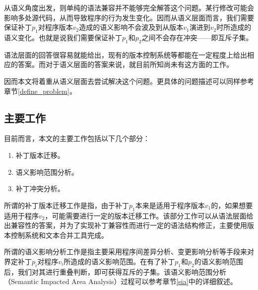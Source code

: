 从语义角度出发，则单纯的语法兼容并不能够完全解答这个问题。某行修改可能会影响多处源代码，从而导致程序的行为发生变化。因而从语义层面而言，我们需要保证补丁$p_1$对程序版本$v_2$造成的语义影响不会波及到从版本$v_1$演进到$v_2$时所造成的语义变化。也就是说我们需要保证补丁$p_1$和$p_2$之间不会存在冲突——即互斥子集。

语法层面的回答很容易就能给出，现有的版本控制系统等都能在一定程度上给出相应的答案。而对于语义层面的答案来说，就目前所知尚未有这方面的工作。

因而本文将着重从语义层面去尝试解决这个问题。更具体的问题描述可以同样参考章节\ref {define_problem}。


\subsection{主要工作}

目前而言，本文的主要工作包括以下几个部分：

\begin{enumerate}
	\item 补丁版本迁移。
	\item 语义影响范围分析。
	\item 补丁冲突分析。		
\end{enumerate}

%		
%		

所谓的补丁版本迁移工作是指，由于补丁$p_1$本来是适用于程序版本$v_1$的，如果想要适用于程序$v_2$，可能需要进行一定的版本迁移工作。该部分工作可以从语法层面给出兼容性的答案，并为了实现补丁兼容性而进行一定的语法结构修正，主要使用版本控制系统和文本合并工具完成。

所谓的语义影响分析工作是指主要采用程序间差异分析、变更影响分析等手段来对界定补丁$p_i$对程序$v_i$所造成的语义影响范围。在有了补丁$p_1$和$p_2$的语义影响范围后，我们对其进行重叠判断，即可获得互斥的子集。该语义影响范围分析（Semantic Impacted Area Analysis）过程可以参考章节\ref {sia}中的详细叙述。

